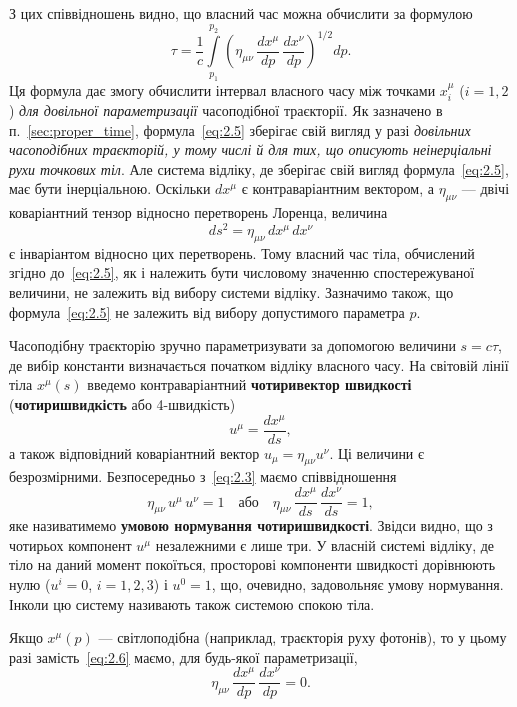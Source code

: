 \documentclass[%
biblatex,
]{ConspectBook}
\begin{document}
З цих співвідношень видно, що власний час можна обчислити за формулою
\begin{equation}
  \tau = \frac{1}{c}\int\limits_{p_1}^{p_2}
    \left(\eta_{\mu\nu}\,\frac{dx^\mu}{dp}\,\frac{dx^\nu}{dp}\right)^{1/2}dp.
  \label{eq:2.5}
\end{equation}
Ця формула дає змогу обчислити інтервал власного часу між точками $x_i^\mu$
($i=1,2$) \textit{для довільної параметризації} часоподібної траєкторії.
Як зазначено в п.~\ref{sec:proper_time}, формула~\eqref{eq:2.5} зберігає свій вигляд у разі
\textit{довільних часоподібних траєкторій, у тому числі й для тих, що
описують неінерціальні рухи точкових тіл}. Але система відліку, де
зберігає свій вигляд формула~\eqref{eq:2.5}, має бути інерціальною. Оскільки
$dx^\mu$ є контраваріантним вектором, а $\eta_{\mu\nu}$ --- двічі
коваріантний тензор відносно перетворень Лоренца, величина
\[
  ds^2 = \eta_{\mu\nu}\,dx^\mu\,dx^\nu
\]
є інваріантом відносно цих перетворень. Тому власний час тіла,
обчислений згідно до~\eqref{eq:2.5}, як і належить бути числовому значенню
спостережуваної величини, не залежить від вибору системи відліку.
Зазначимо також, що формула~\eqref{eq:2.5} не залежить від вибору
допустимого параметра $p$.

Часоподібну траєкторію зручно параметризувати за допомогою величини $s = c\tau$,
де вибір константи визначається початком відліку власного часу. На світовій
лінії тіла $x^\mu(s)$ введемо контраваріантний \textbf{чотиривектор швидкості}
(\textbf{чотиришвидкість} або 4-швидкість)
\[
  u^\mu = \frac{dx^\mu}{ds},
\]
а також відповідний коваріантний вектор $u_\mu = \eta_{\mu\nu}u^\nu$.
Ці величини є безрозмірними. Безпосередньо з~\eqref{eq:2.3} маємо
співвідношення
\begin{equation}
  \eta_{\mu\nu}\,u^\mu\, u^\nu = 1
  \quad\text{або}\quad
  \eta_{\mu\nu}\,\frac{dx^\mu}{ds}\,\frac{dx^\nu}{ds} = 1,
  \label{eq:2.6}
\end{equation}
яке називатимемо \textbf{умовою нормування чотиришвидкості}. Звідси видно,
що з чотирьох компонент $u^\mu$ незалежними є лише три. У власній системі
відліку, де тіло на даний момент покоїться, просторові компоненти
швидкості дорівнюють нулю ($u^i = 0$, $i=1,2,3$) і $u^0 = 1$, що,
очевидно, задовольняє умову нормування. Інколи цю систему називають також
системою спокою тіла.

Якщо $x^\mu(p)$ --- світлоподібна (наприклад, траєкторія руху фотонів),
то у цьому разі замість~\eqref{eq:2.6} маємо, для будь-якої параметризації,
\[
  \eta_{\mu\nu}\,\frac{dx^\mu}{dp}\,\frac{dx^\nu}{dp} = 0.
\]
\end{document}
